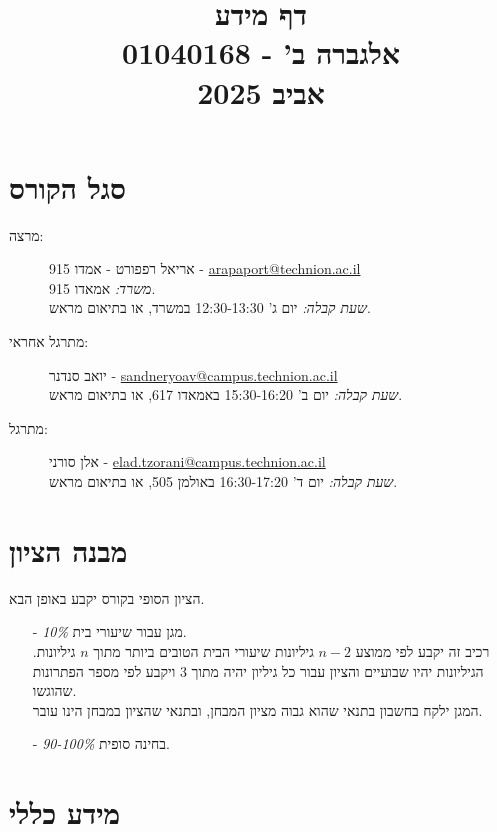 \documentclass{article}
\title{דף מידע \\ אלגברה ב' - 01040168 \\ אביב 2025}
\date{}
\begin{document}
\maketitle

\section*{סגל הקורס}

\begin{description}
\item[מרצה:]
אריאל רפפורט
-
אמדו 915
-
\textenglish{\href{mailto:arapaport@technion.ac.il}{arapaport@technion.ac.il}}
\\
\emph{משרד:}
אמאדו 915.
\\
\emph{שעת קבלה:}
יום ג' 12:30-13:30 במשרד, או בתיאום מראש.

\item[מתרגל אחראי:] 
יואב סנדנר
-
\textenglish{\href{mailto:sandneryoav@campus.technion.ac.il}{sandneryoav@campus.technion.ac.il}}
\\
\emph{שעת קבלה:}
יום ב' 15:30-16:20 באמאדו 617, או בתיאום מראש.

\item[מתרגל:] 
אלן סורני
-
\textenglish{\href{mailto:elad.tzorani@campus.technion.ac.il}{elad.tzorani@campus.technion.ac.il}}
\\
\emph{שעת קבלה:}
יום ד' 16:30-17:20 באולמן 505, או בתיאום מראש.

\end{description}

\section*{מבנה הציון}

הציון הסופי בקורס יקבע באופן הבא.

\begin{itemize}
\item[-] \emph{10\%}
מגן עבור שיעורי בית.
\\
רכיב זה יקבע לפי ממוצע $n-2$ גיליונות שיעורי הבית הטובים ביותר מתוך $n$ גיליונות. הגיליונות יהיו שבועיים והציון עבור כל גיליון יהיה מתוך 3 ויקבע לפי מספר הפתרונות שהוגשו.
\\
המגן ילקח בחשבון בתנאי שהוא גבוה מציון המבחן, ובתנאי שהציון במבחן הינו עובר.
\item[-] \emph{90-100\%}
בחינה סופית.
\end{itemize}

\section*{מידע כללי}
\end{document}
